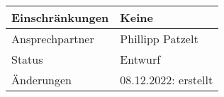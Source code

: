 \begin{table}[H]
\begin{tabularx}{\textwidth}{| l | X |}
        \hline
        Einschränkungen & Keine                                                                                                                                                                                                                                                                                                                                             \\
        \hline
        Ansprechpartner & Phillipp Patzelt                                                                                                                                                                                                                                                                                                                                  \\
        \hline
        Status          & Entwurf                                                                                                                                                                                                                                                                                                                                           \\
        \hline
        Änderungen      & 08.12.2022: erstellt                                                                                                                                                                                                                                                                                                                              \\
        \hline
    \end{tabularx}
\end{table}

